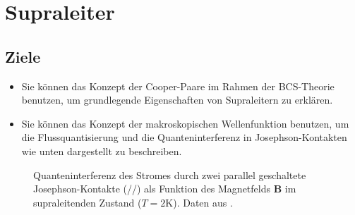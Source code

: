 \renewcommand{\chapterauthors}{Markus Lippitz}
\renewcommand{\lastmod}{11. Juni 2023}

\chapter{Supraleiter}




\section{Ziele}
 


\begin{itemize}
\item Sie können das Konzept der Cooper-Paare im Rahmen der BCS-Theorie benutzen, um grundlegende Eigenschaften von Supraleitern zu erklären.
\item Sie können das Konzept der makroskopischen Wellenfunktion benutzen, um die Flussquantisierung und die Quanteninterferenz in Josephson-Kontakten wie unten dargestellt zu beschreiben.
\end{itemize}

\begin{figure}
    \caption{Quanteninterferenz des Stromes durch zwei parallel geschaltete Josephson-Kontakte (//) als Funktion des Magnetfelds $\bm{B}$ im supraleitenden Zustand ($T=2$K). Daten aus \cite{Jaklevic1965}. \label{fig:6_squid_data}
}
\end{figure}


 


 





